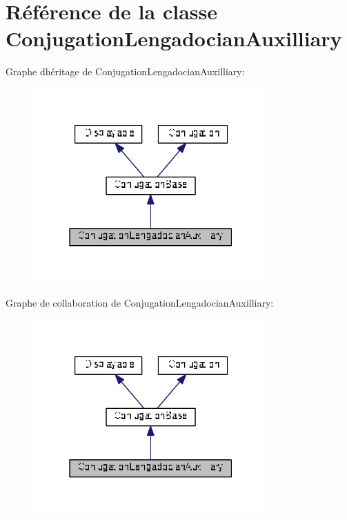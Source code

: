 \hypertarget{class_conjugation_lengadocian_auxilliary}{}\section{Référence de la classe Conjugation\+Lengadocian\+Auxilliary}
\label{class_conjugation_lengadocian_auxilliary}


Graphe d\textquotesingle{}héritage de Conjugation\+Lengadocian\+Auxilliary\+:
\nopagebreak
\begin{figure}[H]
\begin{center}
\leavevmode
\includegraphics[width=256pt]{class_conjugation_lengadocian_auxilliary__inherit__graph}
\end{center}
\end{figure}


Graphe de collaboration de Conjugation\+Lengadocian\+Auxilliary\+:
\nopagebreak
\begin{figure}[H]
\begin{center}
\leavevmode
\includegraphics[width=256pt]{class_conjugation_lengadocian_auxilliary__coll__graph}
\end{center}
\end{figure}
